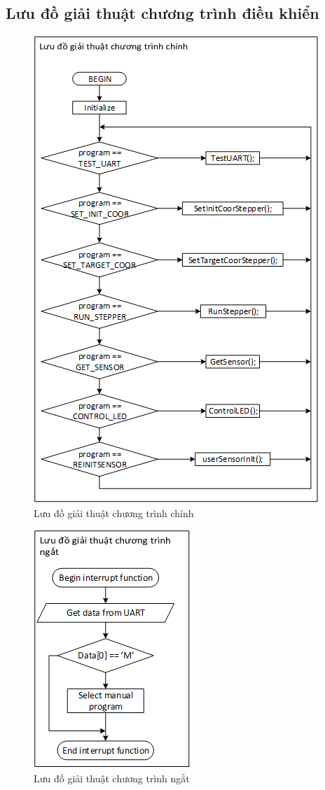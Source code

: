 \subsection{Lưu đồ giải thuật chương trình điều khiển}
\begin{figure}[H]
	\centering
	\includegraphics[scale=1]{Chapters/Chapter5/Images/Luudogiaithuatmain.png}
	\caption{Lưu đồ giải thuật chương trình chính}
	\label{fig:C5main}
\end{figure}
\begin{figure}[ht]
	\centering
	\includegraphics[scale=1]{Chapters/Chapter5/Images/Luudogiaithuatinterrupt.png}
	\caption{Lưu đồ giải thuật chương trình ngắt}
	\label{fig:C5interrupt}
\end{figure}

